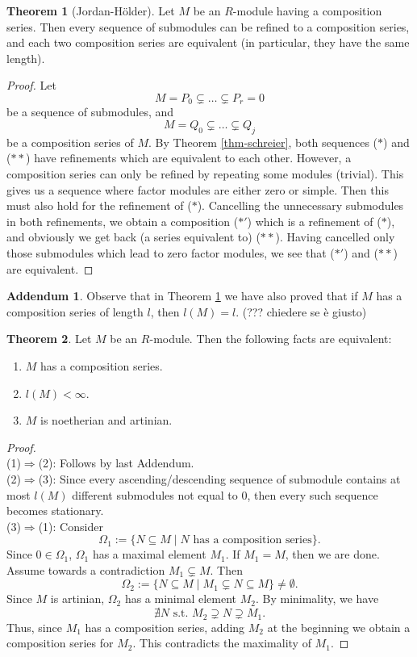 \documentclass[12pt,a4paper]{report}
\theoremstyle{definition}
\newtheorem{theorem}{Theorem}[chapter] %
\newtheorem*{addendum}{Addendum}
\theoremstyle{num.custom-title}
\DeclareMathOperator{\imp}{\Rightarrow}
\DeclareMathOperator{\sse}{\subseteq}
\begin{document}
\begin{theorem}[Jordan-Hölder]\label{thm-jo-ho}
Let $M$ be an $R$-module having a composition series. Then every sequence of submodules can be refined to a composition series, and each two composition series are equivalent (in particular, they have the same length).
\begin{proof}
Let 
\[
M=P_0 \subsetneq \ldots \subsetneq P_r =0 \tag{$*$}
\]
be a sequence of submodules, and
\[
M=Q_0 \subsetneq \ldots \subsetneq Q_j \tag{$**$}
\]
be a composition series of $M$. By Theorem \ref{thm-schreier}, both sequences ($*$) and ($**$) have refinements which are equivalent to each other. However, a composition series can only be refined by repeating some modules (trivial). This gives us a sequence where factor modules are either zero or simple. Then this must also hold for the refinement of ($*$). Cancelling the unnecessary submodules in both refinements, we obtain a composition ($*'$) which is a refinement of ($*$), and obviously we get back (a series equivalent to) ($**$). Having cancelled only those submodules which lead to zero factor modules, we see that ($*'$) and ($**$) are equivalent.
\end{proof}
\end{theorem}

\begin{addendum}
Observe that in Theorem \ref{thm-jo-ho} we have also proved that if $M$ has a composition series of length $l$, then $l(M)=l$. (??? chiedere se è giusto)
\end{addendum}

\begin{theorem}\label{char_exists_comp-series}
Let $M$ be an $R$-module. Then the following facts are equivalent:
\begin{enumerate}
\item $M$ has a composition series.
\item $l(M)<\infty$.
\item $M$ is noetherian and artinian.
\end{enumerate}
\begin{proof}\ \\
(1)$\imp$(2): Follows by last Addendum.
\\[6pt]
(2)$\imp$(3): Since every ascending/descending sequence of submodule contains at most $l(M)$ different submodules not equal to $0$, then every such sequence becomes stationary.
\\[6pt]
(3)$\imp$(1): Consider
\[
\Omega_1 := \{N \sse M \mid N \text{ has a composition series}\}.
\]
Since $0 \in \Omega_1$, $\Omega_1$ has a maximal element $M_1$. If $M_1=M$, then we are done. Assume towards a contradiction $M_1 \subsetneq M$. Then
\[
\Omega_2 := \{N \sse M \mid M_1 \subsetneq N \sse M\} \neq \emptyset.
\]
Since $M$ is artinian, $\Omega_2$ has a minimal element $M_2$. By minimality, we have
\[
\nexists N \text{ s.t. } M_2 \supsetneq N \supsetneq M_1.
\]
Thus, since $M_1$ has a composition series, adding $M_2$ at the beginning we obtain a composition series for $M_2$. This contradicts the maximality of $M_1$.
\end{proof}
\end{theorem}
\end{document}
